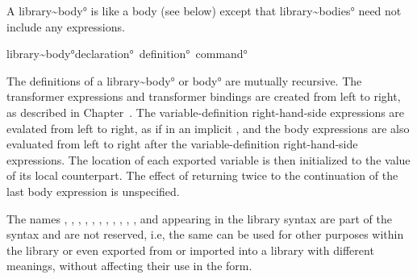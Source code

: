 \documentclass{monograph}
\begin{document}
A \ang{library~body} is like a  body (see below) except that
\ang{library~bodies} need not include any expressions.

\begin{grammar}
\ang{library~body}\longis \ang{declaration}\kstar\ \ang{definition}\kstar\ \ang{command}\kstar
\end{grammar}




The definitions of a \ang{library~body} or \ang{body} are mutually
recursive.
The transformer expressions and transformer bindings are created
from left to right, as described in Chapter~\label{expansionchapter}.
The variable-definition right-hand-side expressions are evalated
from left to right, as if in an implicit ,
and the body expressions are also evaluated from left to right
after the variable-definition right-hand-side expressions.
The location of each exported variable is then initialized to the value
of its local counterpart.
The effect of returning twice to the continuation of the last body
expression is unspecified.

The names , , ,
, , , ,
, , , , and
 appearing in the library syntax are part of the
syntax and are not reserved, i.e, the same can be used for other
purposes within the library or even exported from or imported 
into a library with different meanings, without affecting their
use in the  form.
\end{document}
